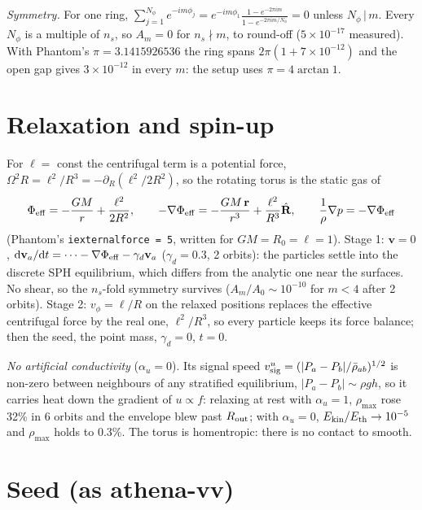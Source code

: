 \documentclass[10pt,a4paper]{article}
\newcommand{\dd}{\mathrm{d}}
\newcommand{\pd}{\partial}
\newcommand{\vr}{\mathbf{r}}
\newcommand{\vv}{\mathbf{v}}
\begin{document}
\emph{Symmetry.} For one ring, $\sum_{j=1}^{N_\phi}e^{-im\phi_j}=e^{-im\phi_1}\frac{1-e^{-2\pi im}}{1-e^{-2\pi im/N_\phi}}=0$
unless $N_\phi\,|\,m$. Every $N_\phi$ is a multiple of $n_s$, so $A_m=0$ for $n_s\nmid m$,
to round-off ($5\times10^{-17}$ measured). With Phantom's $\pi=3.1415926536$ the ring
spans $2\pi(1+7\times10^{-12})$ and the open gap gives $3\times10^{-12}$ in every $m$:
the setup uses $\pi=4\arctan1$.

\section{Relaxation and spin-up}

For $\ell=$ const the centrifugal term is a potential force,
$\Omega^2R=\ell^2/R^3=-\pd_R(\ell^2/2R^2)$, so the rotating torus is the static gas of
\begin{equation}
\Phi_{\rm eff}=-\frac{GM}{r}+\frac{\ell^2}{2R^2},\qquad
-\nabla\Phi_{\rm eff}=-\frac{GM\,\vr}{r^3}+\frac{\ell^2}{R^3}\hat{\mathbf R},\qquad
\frac1\rho\nabla p=-\nabla\Phi_{\rm eff}
\end{equation}
(Phantom's \texttt{iexternalforce = 5}, written for $GM=R_0=\ell=1$).
Stage 1: $\vv=0$, $\dd\vv_a/\dd t=\dots-\nabla\Phi_{\rm eff}-\gamma_d\vv_a$ ($\gamma_d=0.3$,
2 orbits): the particles settle into the discrete SPH equilibrium, which differs from the
analytic one near the surfaces. No shear, so the $n_s$-fold symmetry survives
($A_m/A_0\sim10^{-10}$ for $m<4$ after 2 orbits).
Stage 2: $v_\phi=\ell/R$ on the relaxed positions replaces the effective centrifugal force
by the real one, $\ell^2/R^3$, so every particle keeps its force balance; then the seed,
the point mass, $\gamma_d=0$, $t=0$.

\emph{No artificial conductivity} ($\alpha_u=0$). Its signal speed
$v^u_{\rm sig}=(|P_a-P_b|/\bar\rho_{ab})^{1/2}$ is non-zero between neighbours of any
stratified equilibrium, $|P_a-P_b|\sim\rho g h$, so it carries heat down the gradient of
$u\propto f$: relaxing at rest with $\alpha_u=1$, $\rho_{\max}$ rose 32\% in 6 orbits and
the envelope blew past $R_{\rm out}$; with $\alpha_u=0$, $E_{\rm kin}/E_{\rm th}\to10^{-5}$
and $\rho_{\max}$ holds to 0.3\%. The torus is homentropic: there is no contact to smooth.

\section{Seed (as athena-vv)}
\end{document}
